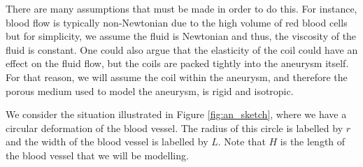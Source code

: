 \documentclass[a4paper, 11pt]{report}
\begin{document}

There are many assumptions that must be made in order to do this. For instance, blood flow is typically non-Newtonian due to the high volume of red blood cells \cite{MORALES2013} but for simplicity, we assume the fluid is Newtonian and thus, the viscosity of the fluid is constant. One could also argue that the elasticity of the coil could have an effect on the fluid flow, but the coils are packed tightly into the aneurysm itself. For that reason, we will assume the coil within the aneurysm, and therefore the porous medium used to model the aneurysm, is rigid and isotropic.





We consider the situation illustrated in Figure \ref{fig:an_sketch}, where we have a circular deformation of the blood vessel. The radius of this circle is labelled by $r$ and the width of the blood vessel is labelled by $L$. Note that $H$ is the length of the blood vessel that we will be modelling.
\end{document}
